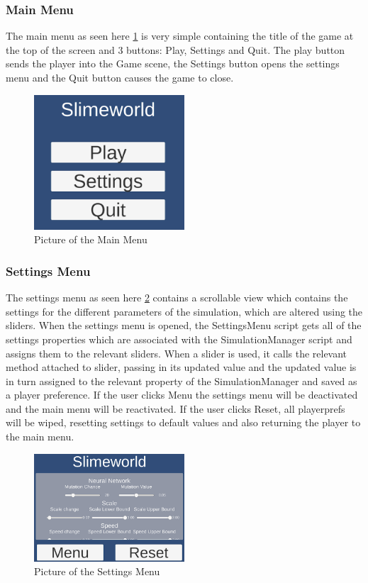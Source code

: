 \subsubsection{Main Menu}
The main menu as seen here \ref{image:mainMenuPicture} is very simple containing the title of the game at the top of the screen and 3 buttons: Play, Settings and Quit. The play button sends the player into the Game scene, the Settings button opens the settings menu and the Quit button causes the game to close.
\begin{figure}[ht!]
    \includegraphics[width=0.5\textwidth]{images/MainMenuPicture.png}
    \caption{Picture of the Main Menu}
    \label{image:mainMenuPicture}
\end{figure}
\subsubsection{Settings Menu}
The settings menu as seen here \ref{image:settingsPicture} contains a scrollable view which contains the settings for the different parameters of the simulation, which are altered using the sliders. When the settings menu is opened, the SettingsMenu script gets all of the settings properties which are associated with the SimulationManager script and assigns them to the relevant sliders. When a slider is used, it calls the relevant method attached to slider, passing in its updated value and the updated value is in turn assigned to the relevant property of the SimulationManager and saved as a player preference. If the user clicks Menu the settings menu will be deactivated and the main menu will be reactivated. If the user clicks Reset, all playerprefs will be wiped, resetting settings to default values and also returning the player to the main menu.
\begin{figure}[ht!]
    \includegraphics[width=0.5\textwidth]{images/SettingsPicture.png}
    \caption{Picture of the Settings Menu}
    \label{image:settingsPicture}
\end{figure}

